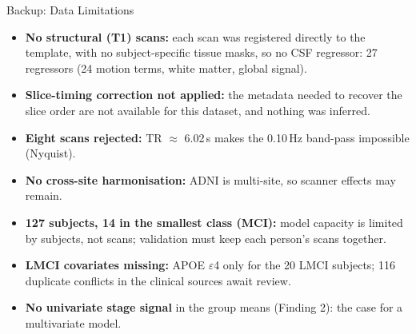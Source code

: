 \documentclass[aspectratio=169,11pt]{beamer}
\begin{document}
\begin{frame}{Backup: Data Limitations}
  \small
  \begin{itemize}
    \item \textbf{No structural (T1) scans:} each scan was registered directly to the template, with no
          subject-specific tissue masks, so no CSF regressor: 27 regressors (24 motion terms, white matter, global signal).
    \item \textbf{Slice-timing correction not applied:} the metadata needed to recover the slice order are
          not available for this dataset, and nothing was inferred.
    \item \textbf{Eight scans rejected:} TR $\approx$ 6.02\,s makes the 0.10\,Hz band-pass impossible (Nyquist).
    \item \textbf{No cross-site harmonisation:} ADNI is multi-site, so scanner effects may remain.
    \item \textbf{127 subjects, 14 in the smallest class (MCI):} model capacity is limited by subjects,
          not scans; validation must keep each person's scans together.
    \item \textbf{LMCI covariates missing:} APOE $\varepsilon$4 only for the 20 LMCI subjects; 116 duplicate
          conflicts in the clinical sources await review.
    \item \textbf{No univariate stage signal} in the group means (Finding 2): the case for a multivariate model.
  \end{itemize}
\end{frame}
\end{document}
